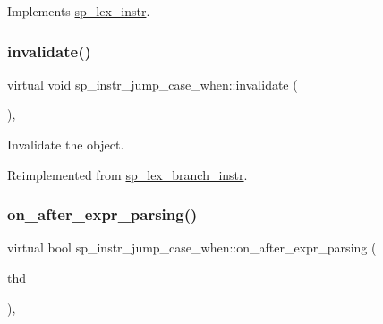 Implements \mbox{\hyperlink{classsp__lex__instr_acab4e56f638f43101c11f838e1f9d395}{sp\+\_\+lex\+\_\+instr}}.

\mbox{\label{classsp__instr__jump__case__when_a35195c6200f0d6e87bde67b83f5fd767}} 
\subsubsection{\texorpdfstring{invalidate()}{invalidate()}}
{\footnotesize\ttfamily virtual void sp\+\_\+instr\+\_\+jump\+\_\+case\+\_\+when\+::invalidate (\begin{DoxyParamCaption}{ }\end{DoxyParamCaption})\hspace{0.3cm}{\ttfamily [inline]}, {\ttfamily [virtual]}}

Invalidate the object. 

Reimplemented from \mbox{\hyperlink{classsp__lex__branch__instr_a91d747da2e1068e2d6ac0fd7c06a4018}{sp\+\_\+lex\+\_\+branch\+\_\+instr}}.

\mbox{\label{classsp__instr__jump__case__when_a590288e701b813831974c6f6f61884f7}} 
\subsubsection{\texorpdfstring{on\+\_\+after\+\_\+expr\+\_\+parsing()}{on\_after\_expr\_parsing()}}
{\footnotesize\ttfamily virtual bool sp\+\_\+instr\+\_\+jump\+\_\+case\+\_\+when\+::on\+\_\+after\+\_\+expr\+\_\+parsing (\begin{DoxyParamCaption}\item[{T\+HD $\ast$}]{thd }\end{DoxyParamCaption})\hspace{0.3cm}{\ttfamily [inline]}, {\ttfamily [virtual]}}

